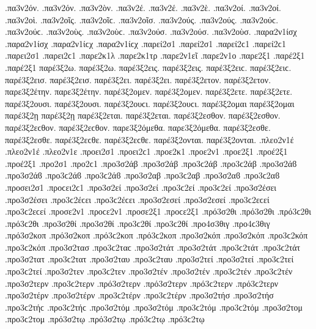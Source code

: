 {.πα3ν2όν. .πα3ν2όν.
.πα3ν2ὸν.
.πα3ν2έ. .πα3ν2έ.
.πα3ν2ὲ.
.πα3ν2οί. .πα3ν2οί.
.πα3ν2οὶ.
.πα3ν2οῖς. .πα3ν2οῖϲ.
.πα3ν2οῖσ.
.πα3ν2ούς. .πα3ν2ούς. .πα3ν2ούϲ. .πα3ν2ούϲ.
.πα3ν2οὺς. .πα3ν2οὺϲ.
.πα3ν2ούσ. .πα3ν2ούσ.
.πα3ν2οὺσ.
.παρα2ν1ίσχ .παρα2ν1ίσχ .παρα2ν1ίϲχ .παρα2ν1ίϲχ   %
.παρεί2σ1 .παρεί2σ1 .παρεί2ϲ1 .παρεί2ϲ1   %
.παρει2σ1 .παρει2ϲ1
.παρε2κ1λ   %
.παρε2κ1τρ   %
.παρε2ν1εῖ   %
.παρε2ν1ο   %
.παρε2ξ1
.παρέ2ξ1 .παρέ2ξ1
παρέ3ξ2ω. παρέ3ξ2ω.   %
παρέ3ξ2εις. παρέ3ξ2εις. παρέ3ξ2ειϲ. παρέ3ξ2ειϲ.
παρέ3ξ2εισ. παρέ3ξ2εισ.
παρέ3ξ2ει. παρέ3ξ2ει.
παρέ3ξ2ετον. παρέ3ξ2ετον.
παρε3ξ2έτην. παρε3ξ2έτην.
παρέ3ξ2ομεν. παρέ3ξ2ομεν.
παρέ3ξ2ετε. παρέ3ξ2ετε.
παρέ3ξ2ουσι. παρέ3ξ2ουσι. παρέ3ξ2ουϲι. παρέ3ξ2ουϲι.
παρέ3ξ2ομαι παρέ3ξ2ομαι
παρέ3ξ2ῃ παρέ3ξ2ῃ
παρέ3ξ2εται. παρέ3ξ2εται.
παρέ3ξ2εσθον. παρέ3ξ2εσθον. παρέ3ξ2εϲθον. παρέ3ξ2εϲθον.
παρε3ξ2όμεθα. παρε3ξ2όμεθα.
παρέ3ξ2εσθε. παρέ3ξ2εσθε. παρέ3ξ2εϲθε. παρέ3ξ2εϲθε.
παρέ3ξ2ονται. παρέ3ξ2ονται.
.πλεο2ν1έ .πλεο2ν1έ   %
.πλεο2ν1ε
.προει2σ1 .προει2ϲ1   %
.προε2κ1   %
.προε2ν1   %
.προε2ξ1   %
.προέ2ξ1 .προέ2ξ1   %
.προ2σ1 .προ2ϲ1
.προ3σ2άβ .προ3σ2άβ .προ3ϲ2άβ .προ3ϲ2άβ .προ3σ2άϐ .προ3σ2άϐ .προ3ϲ2άϐ .προ3ϲ2άϐ %
.προ3σ2αβ .προ3ϲ2αβ .προ3σ2αϐ .προ3ϲ2αϐ
.προσει2σ1 .προϲει2ϲ1   %
.προ3σ2εί .προ3σ2εί .προ3ϲ2εί .προ3ϲ2εί   %
.προ3σ2έσει .προ3σ2έσει .προ3ϲ2έϲει .προ3ϲ2έϲει
.προ3σ2εσεί .προ3σ2εσεί .προ3ϲ2εϲεί .προ3ϲ2εϲεί
.προσε2ν1 .προϲε2ν1   %
.προσε2ξ1 .προϲε2ξ1   %
.πρό3σ2θι .πρό3σ2θι .πρό3ϲ2θι .πρό3ϲ2θι   %
.προ3σ2θί .προ3σ2θί .προ3ϲ2θί .προ3ϲ2θί
.προ4σ3θιγ .προ4ϲ3θιγ   %
.πρό3σ2κοπ .πρό3σ2κοπ .πρό3ϲ2κοπ .πρό3ϲ2κοπ   %
.προ3σ2κόπ .προ3σ2κόπ .προ3ϲ2κόπ .προ3ϲ2κόπ
.προ3σ2τασ .προ3ϲ2ταϲ   %
.προ3σ2τάτ .προ3σ2τάτ .προ3ϲ2τάτ .προ3ϲ2τάτ   %
.προ3σ2τατ .προ3ϲ2τατ   %
.προ3σ2ταυ .προ3ϲ2ταυ   %
.προ3σ2τεί .προ3σ2τεί .προ3ϲ2τεί .προ3ϲ2τεί   %
.προ3σ2τεν .προ3ϲ2τεν   %
.προ3σ2τέν .προ3σ2τέν .προ3ϲ2τέν .προ3ϲ2τέν   %
.προ3σ2τερν .προ3ϲ2τερν   %
.πρό3σ2τερν .πρό3σ2τερν .πρό3ϲ2τερν .πρό3ϲ2τερν   %
.προ3σ2τέρν .προ3σ2τέρν .προ3ϲ2τέρν .προ3ϲ2τέρν
.προ3σ2τήσ .προ3σ2τήσ .προ3ϲ2τήϲ .προ3ϲ2τήϲ   %
.προ3σ2τόμ .προ3σ2τόμ .προ3ϲ2τόμ .προ3ϲ2τόμ   %
.προ3σ2τομ .προ3ϲ2τομ
.πρό3σ2τῳ .πρό3σ2τῳ .πρό3ϲ2τῳ .πρό3ϲ2τῳ   %
}
